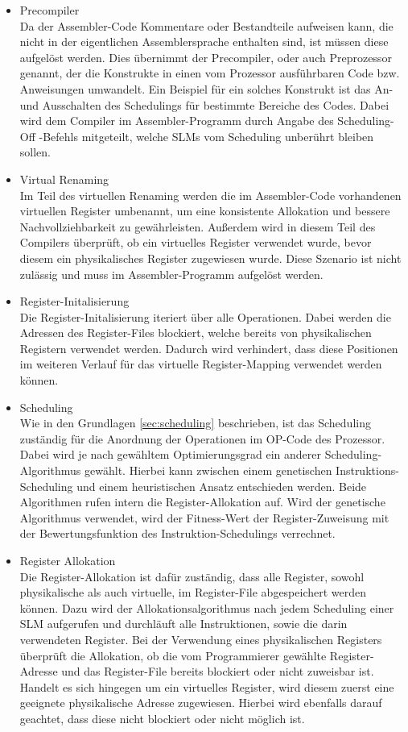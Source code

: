 \begin{itemize}
	\item Precompiler\\
		Da der Assembler-Code Kommentare oder Bestandteile aufweisen kann, die nicht in der eigentlichen Assemblersprache enthalten sind, ist müssen diese aufgelöst werden. Dies übernimmt der Precompiler, oder auch Preprozessor genannt, der die Konstrukte in einen vom Prozessor ausführbaren Code bzw. Anweisungen umwandelt. Ein Beispiel für ein solches Konstrukt ist das An- und Ausschalten des Schedulings für bestimmte Bereiche des Codes. Dabei wird dem Compiler im Assembler-Programm durch Angabe des \glqq Scheduling-Off \grqq-Befehls mitgeteilt, welche SLMs vom Scheduling unberührt bleiben sollen.
	\item Virtual Renaming\\
		Im Teil des virtuellen Renaming werden die im Assembler-Code vorhandenen virtuellen Register umbenannt, um eine konsistente Allokation und bessere Nachvollziehbarkeit zu gewährleisten. Außerdem wird in diesem Teil des Compilers überprüft, ob ein virtuelles Register verwendet wurde, bevor diesem ein physikalisches Register zugewiesen wurde. Diese Szenario ist nicht zulässig und muss im Assembler-Programm aufgelöst werden.
	\item Register-Initalisierung\\
		Die Register-Initalisierung iteriert über alle Operationen. Dabei werden die Adressen des Register-Files blockiert, welche bereits von physikalischen Registern verwendet werden. Dadurch wird verhindert, dass diese Positionen im weiteren Verlauf für das virtuelle Register-Mapping verwendet werden können.
	\item Scheduling\\
		Wie in den Grundlagen \ref{sec:scheduling} beschrieben, ist das Scheduling zuständig für die Anordnung der Operationen im OP-Code des Prozessor. Dabei wird je nach gewähltem Optimierungsgrad ein anderer Scheduling-Algorithmus gewählt. Hierbei kann zwischen einem genetischen Instruktions-Scheduling und einem heuristischen Ansatz entschieden werden. Beide Algorithmen rufen intern die Register-Allokation auf. Wird der genetische Algorithmus verwendet, wird der Fitness-Wert der Register-Zuweisung mit der Bewertungsfunktion des Instruktion-Schedulings verrechnet.
	\item Register Allokation\\
		Die Register-Allokation ist dafür zuständig, dass alle Register, sowohl physikalische als auch virtuelle, im Register-File abgespeichert werden können. Dazu wird der Allokationsalgorithmus nach jedem Scheduling einer SLM aufgerufen und durchläuft alle Instruktionen, sowie die darin verwendeten Register. Bei der Verwendung eines physikalischen Registers überprüft die Allokation, ob die vom Programmierer gewählte Register-Adresse und das Register-File bereits blockiert oder nicht zuweisbar ist. Handelt es sich hingegen um ein virtuelles Register, wird diesem zuerst eine geeignete physikalische Adresse zugewiesen. Hierbei wird ebenfalls darauf geachtet, dass diese nicht blockiert oder nicht möglich ist.

\end{itemize}
